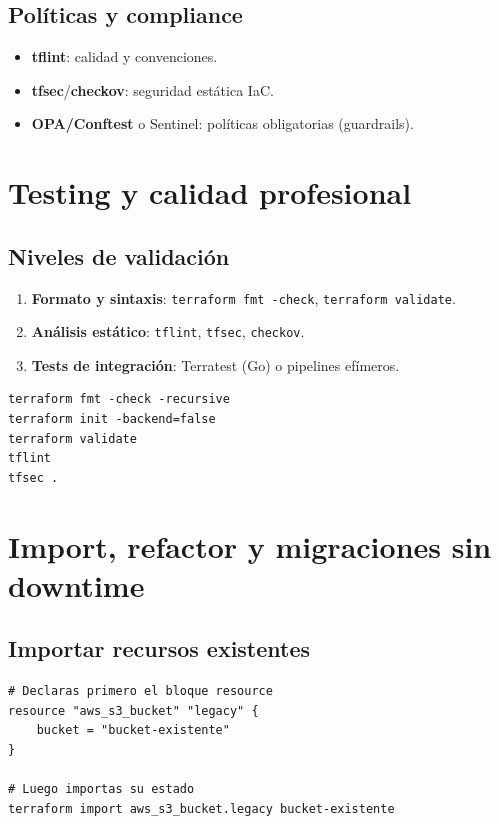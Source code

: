 \documentclass[12pt,a4paper]{article}
\begin{document}
\subsection{Políticas y compliance}
\begin{itemize}
		\item \textbf{tflint}: calidad y convenciones.
		\item \textbf{tfsec}/\textbf{checkov}: seguridad estática IaC.
		\item \textbf{OPA/Conftest} o Sentinel: políticas obligatorias (guardrails).
\end{itemize}

\section{Testing y calidad profesional}

\subsection{Niveles de validación}
\begin{enumerate}
		\item \textbf{Formato y sintaxis}: \texttt{terraform fmt -check}, \texttt{terraform validate}.
		\item \textbf{Análisis estático}: \texttt{tflint}, \texttt{tfsec}, \texttt{checkov}.
		\item \textbf{Tests de integración}: Terratest (Go) o pipelines efímeros.
\end{enumerate}

\begin{lstlisting}[caption=Pipeline mínima de calidad]
terraform fmt -check -recursive
terraform init -backend=false
terraform validate
tflint
tfsec .
\end{lstlisting}

\section{Import, refactor y migraciones sin downtime}

\subsection{Importar recursos existentes}
\begin{lstlisting}[caption=Import básico]
# Declaras primero el bloque resource
resource "aws_s3_bucket" "legacy" {
	bucket = "bucket-existente"
}

# Luego importas su estado
terraform import aws_s3_bucket.legacy bucket-existente
\end{lstlisting}
\end{document}
